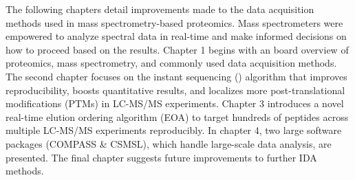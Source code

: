 The following chapters detail improvements made to the data acquisition methods used in mass spectrometry-based proteomics. Mass spectrometers were empowered to analyze spectral data in real-time and make informed decisions on how to proceed based on the results. Chapter 1 begins with an board overview of proteomics, mass spectrometry, and commonly used data acquisition methods. The second chapter focuses on the instant sequencing (\inseq{}) algorithm that improves reproducibility, boosts quantitative results, and localizes more post-translational modifications (PTMs) in LC-MS/MS experiments. Chapter 3 introduces a novel real-time elution ordering algorithm (EOA) to target hundreds of peptides across multiple LC-MS/MS experiments reproducibly. In chapter 4, two large software packages (COMPASS \& CSMSL), which handle large-scale data analysis, are presented. The final chapter suggests future improvements to further IDA methods.